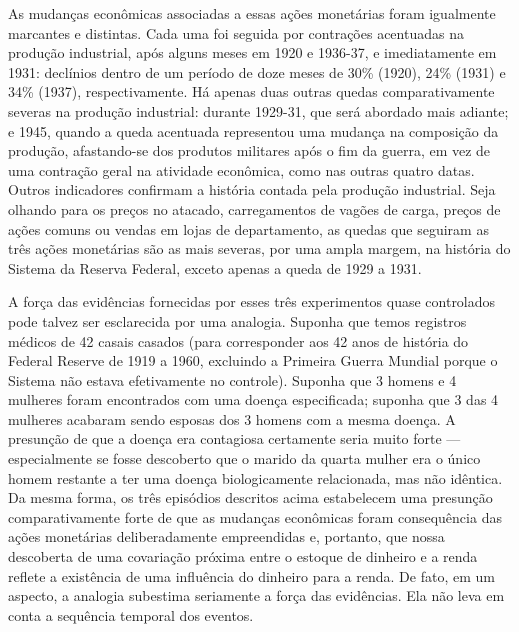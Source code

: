 \documentclass[a4paper,12pt]{article}[abntex2]
\begin{document}
As mudanças econômicas associadas a essas ações monetárias foram igualmente marcantes e distintas. Cada uma foi seguida por contrações acentuadas na produção industrial, após alguns meses em 1920 e 1936-37, e imediatamente em 1931: declínios dentro de um período de doze meses de 30\% (1920), 24\% (1931) e 34\% (1937), respectivamente. Há apenas duas outras quedas comparativamente severas na produção industrial: durante 1929-31, que será abordado mais adiante; e 1945, quando a queda acentuada representou uma mudança na composição da produção, afastando-se dos produtos militares após o fim da guerra, em vez de uma contração geral na atividade econômica, como nas outras quatro datas. Outros indicadores confirmam a história contada pela produção industrial. Seja olhando para os preços no atacado, carregamentos de vagões de carga, preços de ações comuns ou vendas em lojas de departamento, as quedas que seguiram as três ações monetárias são as mais severas, por uma ampla margem, na história do Sistema da Reserva Federal, exceto apenas a queda de 1929 a 1931.

A força das evidências fornecidas por esses três experimentos quase controlados pode talvez ser esclarecida por uma analogia. Suponha que temos registros médicos de 42 casais casados (para corresponder aos 42 anos de história do Federal Reserve de 1919 a 1960, excluindo a Primeira Guerra Mundial porque o Sistema não estava efetivamente no controle). Suponha que 3 homens e 4 mulheres foram encontrados com uma doença especificada; suponha que 3 das 4 mulheres acabaram sendo esposas dos 3 homens com a mesma doença. A presunção de que a doença era contagiosa certamente seria muito forte — especialmente se fosse descoberto que o marido da quarta mulher era o único homem restante a ter uma doença biologicamente relacionada, mas não idêntica. Da mesma forma, os três episódios descritos acima estabelecem uma presunção comparativamente forte de que as mudanças econômicas foram consequência das ações monetárias deliberadamente empreendidas e, portanto, que nossa descoberta de uma covariação próxima entre o estoque de dinheiro e a renda reflete a existência de uma influência do dinheiro para a renda. De fato, em um aspecto, a analogia subestima seriamente a força das evidências. Ela não leva em conta a sequência temporal dos eventos.
\end{document}
